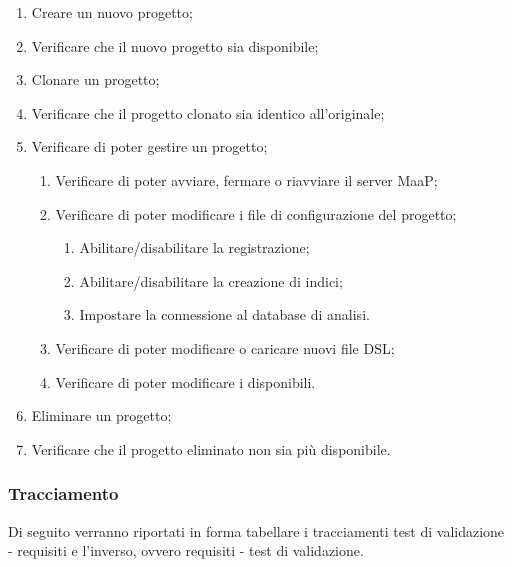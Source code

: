 \begin{enumerate}
\item Creare un nuovo progetto;
\item Verificare che il nuovo progetto sia disponibile;
\item Clonare un progetto;
\item Verificare che il progetto clonato sia identico all’originale;
\item Verificare di poter gestire un progetto;
\begin{enumerate}
\item Verificare di poter avviare, fermare o riavviare il server MaaP;
\item Verificare di poter modificare i file di configurazione del progetto;
\begin{enumerate}
\item Abilitare/disabilitare la registrazione;
\item Abilitare/disabilitare la creazione di indici;
\item Impostare la connessione al database di analisi.
\end{enumerate}
\item Verificare di poter modificare o caricare nuovi file DSL;
\item Verificare di poter modificare i  disponibili.
\end{enumerate}
\item Eliminare un progetto;
\item Verificare che il progetto eliminato non sia più disponibile.
\end{enumerate}

\subsubsection{Tracciamento}
Di seguito verranno riportati in forma tabellare i tracciamenti test di validazione - requisiti e l'inverso, ovvero requisiti - test di validazione.\\
